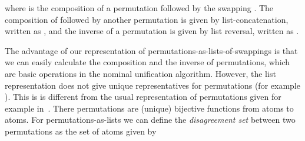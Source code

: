\begin{isabellebody}
\begin{isamarkuptext}
  \noindent
  where   is the composition of a permutation
  followed by the swapping .  The composition of 
  followed by another permutation  is given by list-concatenation,
  written as , and the inverse of a permutation is given by
  list reversal, written as .  

  The advantage of our representation of permutations-as-lists-of-swappings is
  that we can easily calculate the composition and the inverse of
  permutations, which are basic operations in the nominal unification
  algorithm. However, the list representation does not give unique
  representatives for permutations (for example ). This is 
  is different from the usual representation of permutations given for example in~\cite{HuffmanUrban10}.
  There permutations are (unique) bijective functions from atoms to atoms. For permutations-as-lists 
  we can define the \emph{disagreement set} between two permutations as the set of atoms 
  given by

  \begin{center}
  \end{center}


\end{isamarkuptext}
\end{isabellebody}
